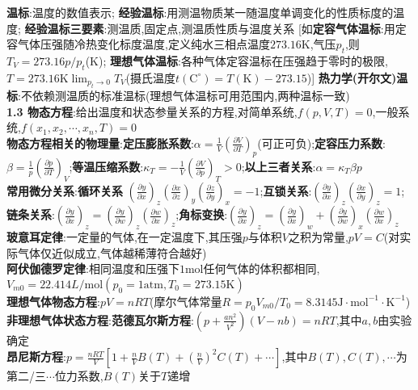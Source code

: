 \documentclass[10pt,a4paper]{article}
\begin{document}
\begin{multicols}{2}
\textbf{温标}:温度的数值表示;
\textbf{经验温标}:用测温物质某一随温度单调变化的性质标度的温度;
\textbf{经验温标三要素}:测温质,固定点,测温质性质与温度关系
[如\textbf{定容气体温标}:用定容气体压强随冷热变化标度温度,定义纯水三相点温度$273.16$K,气压$p_t$,则$T_V=273.16p/p_t$(K);
\textbf{理想气体温标}:各种气体定容温标在压强趋于零时的极限,$T=273.16\text{K}\lim_{p_t\rightarrow0}T_V$(摄氏温度$t(\text{C}^{\circ})=T(\text{K})-273.15$)]
\textbf{热力学(开尔文)温标}:不依赖测温质的标准温标(理想气体温标可用范围内,两种温标一致)\\
\textbf{1.3 物态方程}:给出温度和状态参量关系的方程,对简单系统,$f(p,V,T)=0$,一般系统,$f(x_1,x_2,\cdots,x_n,T)=0$\\
\textbf{物态方程相关的物理量}:\textbf{定压膨胀系数}:$\alpha=\frac{1}{V}\left(\frac{\partial V}{\partial T}\right)_p$(可正可负);\textbf{定容压力系数}:$\beta=\frac{1}{p}\left(\frac{\partial p}{\partial T}\right)_V$;\textbf{等温压缩系数}:$\kappa_T=-\frac{1}{V}\left(\frac{\partial V}{\partial p}\right)_T>0$;\textbf{以上三者关系}:$\alpha=\kappa_T\beta p$\\
\textbf{常用微分关系}:\textbf{循环关系} $\left(\frac{\partial y}{\partial x}\right)_z\left(\frac{\partial x}{\partial z}\right)_y\left(\frac{\partial z}{\partial y}\right)_x=-1$;\textbf{互锁关系}:$\left(\frac{\partial y}{\partial x}\right)_z\left(\frac{\partial x}{\partial y}\right)_z=1$;\textbf{链条关系}:$\left(\frac{\partial y}{\partial x}\right)_z=\left(\frac{\partial y}{\partial w}\right)_z\left(\frac{\partial w}{\partial x}\right)_z$;\textbf{角标变换}:$\left(\frac{\partial y}{\partial x}\right)_z=\left(\frac{\partial y}{\partial x}\right)_w+\left(\frac{\partial y}{\partial w}\right)_x\left(\frac{\partial w}{\partial x}\right)_z$\\
\textbf{玻意耳定律}:一定量的气体,在一定温度下,其压强$p$与体积$V$之积为常量,$pV=C$(对实际气体仅近似成立,气体越稀薄符合越好)\\
\textbf{阿伏伽德罗定律}:相同温度和压强下$1$mol任何气体的体积都相同,$V_{m0}=22.414L/\text{mol}(p_0=1\text{atm},T_0=273.15\text{K})$\\
\textbf{理想气体物态方程}:$pV=nRT$(摩尔气体常量$R={p_0V_{m0}}/{T_0}=8.3145\text{J}\cdot\text{mol}^{-1}\cdot\text{K}^{-1}$)\\
\textbf{非理想气体状态方程}:\textbf{范德瓦尔斯方程}:$(p+\frac{an^2}{V^2})(V-nb)=nRT$,其中$a,b$由实验确定\\
\indent\textbf{昂尼斯方程}:$p=\frac{nRT}{V}\left[1+\frac{n}{V}B(T)+\left(\frac{n}{V}\right)^2C(T)+\cdots\right]$,其中$B(T),C(T),\cdots$为第二/三$\cdots$位力系数,$B(T)$关于$T$递增\\

\end{multicols}
\end{document}
